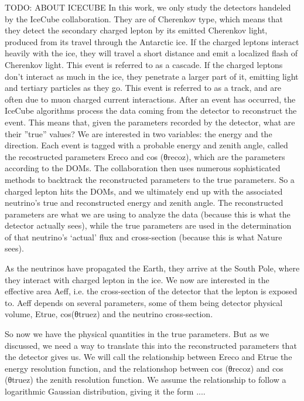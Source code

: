 \documentclass{article}
\begin{document}
TODO: ABOUT ICECUBE
In this work, we only study the detectors handeled by the IceCube collaboration.
They are of
Cherenkov type, which means that they detect the secondary charged lepton by its emitted Cherenkov
light, produced from its travel through the Antarctic ice. If the charged leptons interact heavily with the
ice, they will travel a short distance and emit a localized flash of Cherenkov light. This event is referred
to as a cascade.
If the charged leptons don’t interact as much in the ice, they penetrate a larger part of it,
emitting light and tertiary particles as they go. This event is referred to as a track, and are often due to
muon charged current interactions.
After an event has occurred, the IceCube algorithms process the data coming from the detector to
reconstruct the event. This means that, given the parameters recorded by the detector, what are their
”true” values? We are interested in two variables: the energy and the direction. Each event is tagged with
a probable energy and zenith angle, called the recostructed parameters Ereco and cos (θrecoz), which are
the parameters according to the DOMs. The collaboration then uses numerous sophisticated methods to
backtrack the reconstructed parameters to the true parameters. So a charged lepton hits the DOMs, and
we ultimately end up with the associated neutrino’s true and reconstructed energy and zenith angle. The
reconstructed parameters are what we are using to analyze the data (because this is what the detector
actually sees), while the true parameters are used in the determination of that neutrino’s ‘actual’ flux
and cross-section (because this is what Nature sees).

As the neutrinos have propagated the Earth, they arrive at the South Pole, where they interact with
charged lepton in the ice. We now are interested in the effective area Aeff, i.e. the cross-section of the
detector that the lepton is exposed to. Aeff depends on several parameters, some of them being detector
physical volume, Etrue, cos(θtruez) and the neutrino cross-section.

So now we have the physical quantities in the true parameters. But as we discussed, we need a way to
translate this into the reconstructed parameters that the detector gives us. We will call the relationship
between Ereco and Etrue the energy resolution function, and the relationshop between cos (θrecoz) and
cos (θtruez) the zenith resolution function. We assume the relationship to follow a logarithmic Gaussian
distribution, giving it the form ....
\end{document}
